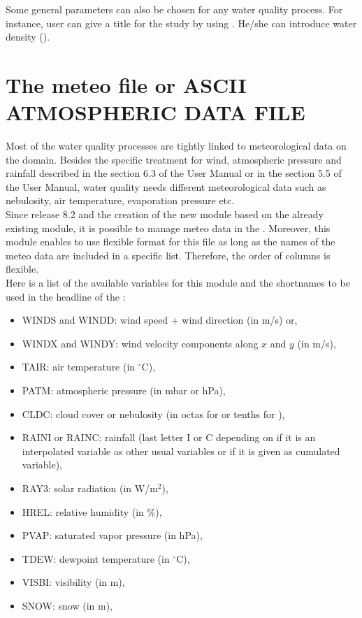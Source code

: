 Some general parameters can also be chosen for any water quality process.
For instance, user can give a title for the study by using .
He/she can introduce water density ().


\section{The meteo file or ASCII ATMOSPHERIC DATA FILE}
\label{subs:meteo:file}
Most of the water quality processes are tightly linked to
meteorological data on the domain.
Besides the specific treatment for wind, atmospheric pressure
and rainfall described in the section 6.3 of the  User Manual
or in the section 5.5 of the  User Manual,
water quality needs different meteorological data such as
nebulosity, air temperature, evaporation pressure etc.\\

Since release 8.2 and the creation of the new  module
based on the already existing  module, it is possible to
manage meteo data in the .
Moreover, this module enables to use flexible format for this file as long as
the names of the meteo data are included in a specific list.
Therefore, the order of columns is flexible.\\

Here is a list of the available variables for this module and the shortnames to
be used in the headline of the :
\begin{itemize}
\item WINDS and WINDD: wind speed + wind direction (in m/s) or,
\item WINDX and WINDY: wind velocity components along $x$ and $y$ (in m/s),
\item TAIR: air temperature (in $^{\circ}$C),
\item PATM: atmospheric pressure (in mbar or hPa),
\item CLDC: cloud cover or nebulosity (in octas for \waqtel or tenths for
\khione),
\item RAINI or RAINC: rainfall (last letter I or C depending on if it is
an interpolated variable as other usual variables
or if it is  given as cumulated variable),
\item RAY3: solar radiation (in W/m$^2$),
\item HREL: relative humidity (in \%),
\item PVAP: saturated vapor pressure (in hPa),
\item TDEW: dewpoint temperature (in $^{\circ}$C),
\item VISBI: visibility (in m),
\item SNOW: snow (in m),
\end{itemize}

